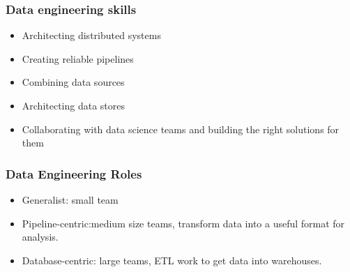 \begin{frame}[fragile]\frametitle{Data engineering skills}
\begin{itemize}
\item Architecting distributed systems
\item Creating reliable pipelines
\item Combining data sources
\item Architecting data stores
\item Collaborating with data science teams and building the right solutions for them
\end{itemize}
\end{frame}

\begin{frame}[fragile]\frametitle{Data Engineering Roles}
\begin{itemize}
\item Generalist: small team
\item Pipeline-centric:medium size teams, transform data into a useful format for analysis.
\item Database-centric: large teams, ETL work to get data into warehouses.
\end{itemize}
\end{frame}


